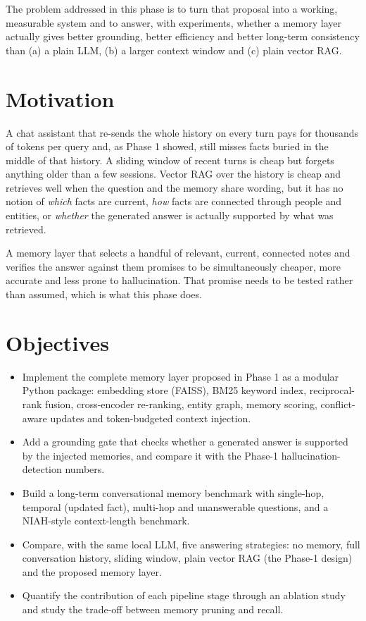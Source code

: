 The problem addressed in this phase is to turn that proposal into a working, measurable system and to
answer, with experiments, whether a memory layer actually gives better grounding, better efficiency and
better long-term consistency than (a) a plain LLM, (b) a larger context window and (c) plain vector RAG.

\section{Motivation}
A chat assistant that re-sends the whole history on every turn pays for thousands of tokens per query and,
as Phase 1 showed, still misses facts buried in the middle of that history. A sliding window of recent turns
is cheap but forgets anything older than a few sessions. Vector RAG over the history is cheap and retrieves
well when the question and the memory share wording, but it has no notion of \emph{which} facts are current,
\emph{how} facts are connected through people and entities, or \emph{whether} the generated answer is
actually supported by what was retrieved.

A memory layer that selects a handful of relevant, current, connected notes and verifies the answer against
them promises to be simultaneously cheaper, more accurate and less prone to hallucination. That promise
needs to be tested rather than assumed, which is what this phase does.

\section{Objectives}
\begin{itemize}[nosep]
  \item Implement the complete memory layer proposed in Phase 1 as a modular Python package: embedding
        store (FAISS), BM25 keyword index, reciprocal-rank fusion, cross-encoder re-ranking, entity graph,
        memory scoring, conflict-aware updates and token-budgeted context injection.
  \item Add a grounding gate that checks whether a generated answer is supported by the injected memories,
        and compare it with the Phase-1 hallucination-detection numbers.
  \item Build a long-term conversational memory benchmark with single-hop, temporal (updated fact),
        multi-hop and unanswerable questions, and a NIAH-style context-length benchmark.
  \item Compare, with the same local LLM, five answering strategies: no memory, full conversation history,
        sliding window, plain vector RAG (the Phase-1 design) and the proposed memory layer.
  \item Quantify the contribution of each pipeline stage through an ablation study and study the trade-off
        between memory pruning and recall.
\end{itemize}


